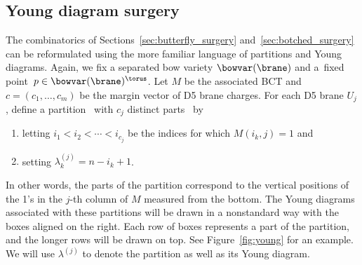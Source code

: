 \subsection{Young diagram surgery}
The combinatorics of Sections~\ref{sec:butterfly_surgery} and~\ref{sec:botched_surgery} can be reformulated using the more familiar language of partitions and Young diagrams. Again, we fix a separated bow variety $\bowvar(\brane)$ and a~fixed point~${p\in \bowvar(\brane)^\torus}$. Let $M$ be the associated BCT and $c=(c_1, \dots , c_m)$ be the margin vector of D5 brane charges. For each D5 brane $U_j$, define a partition~ with $c_j$ distinct parts~ by
\begin{enumerate}\itemsep=0pt
\item[(1)] letting $i_1 < i_2 < \cdots < i_{c_j}$ be the indices for which $M(i_k, j) = 1$ and
\item[(2)] setting $\lambda^{(j)}_k = n - i_k + 1$.
\end{enumerate}
In other words, the parts of the partition correspond to the vertical positions of the 1's in the $j$-th column of $M$ measured from the bottom. The Young diagrams associated with these partitions will be drawn in a nonstandard way with the boxes aligned on the right. Each row of boxes represents a part of the partition, and the longer rows will be drawn on top. See Figure~\ref{fig:young} for an example. We will use $\lambda^{(j)}$ to denote the partition as well as its Young diagram.

